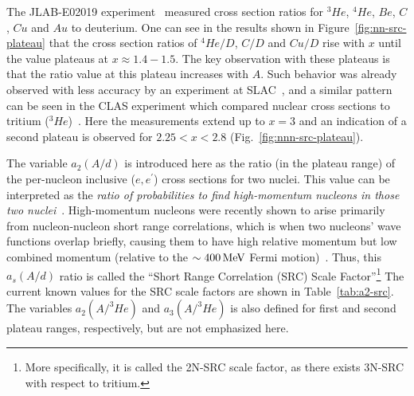 The JLAB-E02019 experiment~\cite{Fomin:2011ng} measured cross section ratios for $^3He$, $^4He$, $Be$, $C$, $Cu$ and $Au$ to deuterium. One can see in the results shown in Figure~\ref{fig:nn-src-plateau} that the cross section ratios of $^4He/D$, $C/D$ and $Cu/D$ rise with $x$ until the value plateaus at $x \approx 1.4 - 1.5$. The key observation with these plateaus is that the ratio value at this plateau increases with $A$. Such behavior was already observed with less accuracy by an experiment at SLAC~\cite{Frankfurt:1993sp}, and a similar pattern can be seen in the CLAS experiment which compared nuclear cross sections to tritium ($^3He$)~\cite{PhysRevLett.96.082501}. Here the measurements extend up to $x=3$ and an indication of a second plateau is observed for $2.25<x<2.8$ (Fig.~\ref{fig:nnn-src-plateau}). 

The variable $a_2(A/d)$ is introduced here as the ratio (in the plateau range) of the per-nucleon inclusive ($e,e^\prime$) cross sections for two nuclei. This value can be interpreted as the \emph{ratio of probabilities to find high-momentum nucleons in those two nuclei}~\cite{PhysRevLett.106.052301}. High-momentum nucleons were recently shown to arise primarily from nucleon-nucleon short range correlations, which is when two nucleons' wave functions overlap briefly, causing them to have high relative momentum but low combined momentum (relative to the $\sim\unit[400]{MeV}$ Fermi motion)~\cite{PhysRevLett.100.162503}.  Thus, this $a_s(A/d)$ ratio is called the ``Short Range Correlation (SRC) Scale Factor''\footnote{More specifically, it is called the 2N-SRC scale factor, as there exists 3N-SRC with respect to tritium.}  The current known values for the SRC scale factors are shown in Table~\ref{tab:a2-src}. The variables $a_2(A/^3He)$ and $a_3(A/^3He)$ is also defined for first and second plateau ranges, respectively, but are not emphasized here.

